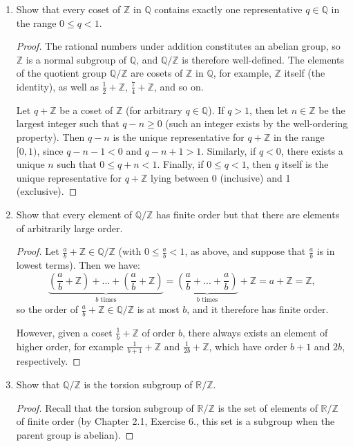\documentclass{article}
\begin{document}
\begin{enumerate}[label=(\alph*), itemsep=0em]
    \item Show that every coset of $\mathbb{Z}$ in $\mathbb{Q}$ contains exactly one representative $q \in \mathbb{Q}$ in the range $0 \leq q < 1$.
          \begin{proof}
            The rational numbers under addition constitutes an abelian group, so $\mathbb{Z}$ is a normal subgroup of $\mathbb{Q}$, and $\mathbb{Q}/\mathbb{Z}$ is therefore well-defined. The elements of the quotient group $\mathbb{Q}/\mathbb{Z}$ are cosets of $\mathbb{Z}$ in $\mathbb{Q}$, for example, $\mathbb{Z}$ itself (the identity), as well as $\frac{1}{2} + \mathbb{Z}$, $\frac{7}{4} + \mathbb{Z}$, and so on.

            Let $q + \mathbb{Z}$ be a coset of $\mathbb{Z}$ (for arbitrary $q \in \mathbb{Q}$). If $q > 1$, then let $n \in \mathbb{Z}$ be the largest integer such that $q - n \geq 0$ (such an integer exists by the well-ordering property). Then $q - n$ is the unique representative for $q + \mathbb{Z}$ in the range $[0, 1)$, since $q - n - 1 < 0$ and $q - n + 1 > 1$. Similarly, if $q < 0$, there exists a unique $n$ such that $0 \leq q + n < 1$. Finally, if $0 \leq q < 1$, then $q$ itself is the unique representative for $q + \mathbb{Z}$ lying between 0 (inclusive) and 1 (exclusive).
          \end{proof}
    \item Show that every element of $\mathbb{Q}/\mathbb{Z}$ has finite order but that there are elements of arbitrarily large order.
          \begin{proof}
            Let $\frac{a}{b} + \mathbb{Z} \in \mathbb{Q}/\mathbb{Z}$ (with $0 \leq \frac{a}{b} < 1$, as above, and suppose that $\frac{a}{b}$ is in lowest terms). Then we have:
            \begin{equation*}
                \underbrace{(\frac{a}{b} + \mathbb{Z}) + ... + (\frac{a}{b} + \mathbb{Z})}_{b \text{ times}} = \underbrace{(\frac{a}{b} + ... + \frac{a}{b})}_{b \text{ times}} + \mathbb{Z} = a + \mathbb{Z} = \mathbb{Z},
            \end{equation*}
            so the order of $\frac{a}{b} + \mathbb{Z} \in \mathbb{Q}/\mathbb{Z}$ is at most $b$, and it therefore has finite order.

            However, given a coset $\frac{1}{b} + \mathbb{Z}$ of order $b$, there always exists an element of higher order, for example $\frac{1}{b + 1} + \mathbb{Z}$ and $\frac{1}{2b} + \mathbb{Z}$, which have order $b + 1$ and $2b$, respectively.
          \end{proof}
    \item Show that $\mathbb{Q}/\mathbb{Z}$ is the torsion subgroup of $\mathbb{R}/\mathbb{Z}$.
          \begin{proof}
            Recall that the torsion subgroup of $\mathbb{R}/\mathbb{Z}$ is the set of elements of $\mathbb{R}/\mathbb{Z}$ of finite order (by Chapter 2.1, Exercise 6., this set is a subgroup when the parent group is abelian).


\end{proof}
\end{enumerate}
\end{document}
